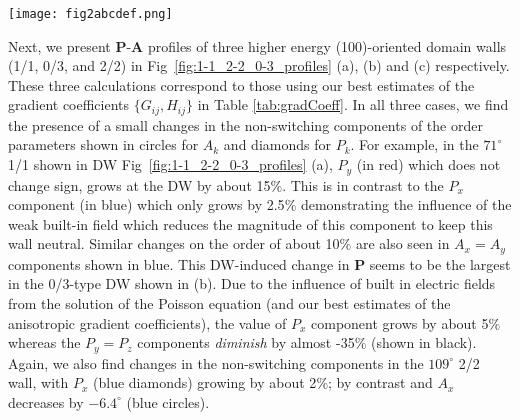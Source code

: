 \documentclass[%
 reprint,
superscriptaddress,
 amsmath,amssymb,
prb,
]{revtex4-1}
\newcommand*{\citen}[1]{%
  \begingroup
    \romannumeral-`\x %
    \setcitestyle{numbers}%
    \cite{#1}%
  \endgroup   
}
\begin{document}
\begin{figure*}\centering
\hspace*{-12pt}\texttt{[image: fig2abcdef.png]}
\caption{\label{fig:1-1_2-2_0-3_profiles} $\mathbf{P}$-$\mathbf{A}$ profiles in arclengths perpendicular to the (100)-oriented DW plane for the (a) 1/1 ($71^\circ$), (b) 0/3 ($180^\circ$ in $\mathbf{A}$), and (c) 2/2 ($109^\circ$) type boundaries. Below in (d), (e),and (f) are the spontaneous strain fields for the normal and shear components along the same arclength. Far from the DW, the solutions converge to the values ($P_s, A_s, \varepsilon_s, \varepsilon_n$), of the ground state.}
\end{figure*}

%
Next, we present $\mathbf{P}$-$\mathbf{A}$ profiles of three higher energy (100)-oriented domain walls (1/1, 0/3, and 2/2) in Fig~\ref{fig:1-1_2-2_0-3_profiles} (a), (b) and (c) respectively.
%
These three calculations correspond to those using our best estimates of the gradient coefficients $\{G_{ij},H_{ij}\}$ in Table \ref{tab:gradCoeff}.
%
In all three cases, we find the presence of a small changes in the non-switching components of the order parameters shown in circles for $A_k$ and diamonds for $P_k$.
%
For example, in the $71^\circ$ 1/1 shown in DW Fig~\ref{fig:1-1_2-2_0-3_profiles} (a), $P_y$ (in red) which does not change sign, grows at the DW by about 15$\%$.
%
This is in contrast to the $P_x$ component (in blue) which only grows by 2.5$\%$ demonstrating the influence of the weak built-in field which reduces the magnitude of this component to keep this wall neutral.
%
Similar changes on the order of about 10$\%$ are also seen in $A_x = A_y$ components shown in blue.
%
This DW-induced change in $\textbf{P}$ seems to be the largest in the 0/3-type DW shown in (b).
%
Due to the influence of built in electric fields from the solution of the Poisson equation (and our best estimates of the anisotropic gradient coefficients), the value of $P_x$ component grows by about 5$\%$ whereas the $P_y = P_z$ components \emph{diminish} by almost -35$\%$ (shown in black).
%
%
Again, we also find changes in the non-switching components in the $109^\circ$ 2/2 wall, with $P_x$ (blue diamonds) growing by about 2$\%$; by contrast and $A_x$ decreases by $-6.4^\circ$ (blue circles).
%
%
\end{document}
